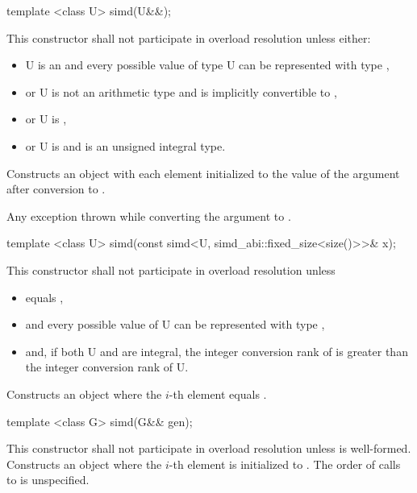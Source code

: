 \begin{itemdecl}
template <class U> simd(U&&);
\end{itemdecl}
\begin{itemdescr}
  \pnum\remarks This constructor shall not participate in overload resolution unless either:
  \begin{itemize}
    \item \type U is an \realArithmeticType and every possible value of type \type U can be represented with type ,
    \item or \type U is not an arithmetic type and is implicitly convertible to ,
    \item or \type U is \intt,
    \item or \type U is \uint and  is an unsigned integral type.
  \end{itemize}
  \pnum\effects Constructs an object with each element initialized to the value of the argument after conversion to .

  \pnum\throws Any exception thrown while converting the argument to .
\end{itemdescr}

\begin{itemdecl}
template <class U> simd(const simd<U, simd_abi::fixed_size<size()>>& x);
\end{itemdecl}
\begin{itemdescr}
  \pnum\remarks This constructor shall not participate in overload resolution unless
  \begin{itemize}
    \item {} equals \fixedsizescoped{},
    \item and every possible value of \type U can be represented with type ,
    \item and, if both \type U and  are integral, the integer conversion rank \parencite[(4.15)]{N4618} of  is greater than the integer conversion rank of \type U.
  \end{itemize}
  \pnum\effects Constructs an object where the $i$-th element equals  \foralli.
\end{itemdescr}

\begin{itemdecl}
template <class G> simd(G&& gen);
\end{itemdecl}
\begin{itemdescr}
  \pnum\remarks This constructor shall not participate in overload resolution unless  is well-formed.%
  \pnum\effects Constructs an object where the $i$-th element is initialized to .
  \pnum\remarks The order of calls to  is unspecified.
\end{itemdescr}

